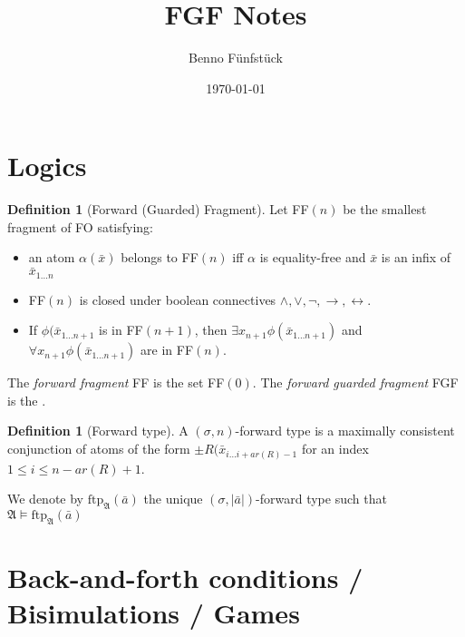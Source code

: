 \documentclass[draft]{scrartcl}
\title{FGF Notes}
\author{Benno Fünfstück}
\date{\today}
\theoremstyle{definition}
\newtheorem{definition}[theorem]{Definition}
\begin{document}
\maketitle

\section{Logics}

\begin{definition}[Forward (Guarded) Fragment]
Let FF$(n)$ be the smallest fragment of FO satisfying:

\begin{itemize}
    \item an atom $\alpha(\bar{x})$ belongs to FF$(n)$ iff $\alpha$ is equality-free and $\bar{x}$ is an infix of $\bar{x}_{1\ldots{}n}$
    \item FF$(n)$ is closed under boolean connectives $\land, \lor, \neg, \rightarrow, \leftrightarrow$.
    \item If $\phi(\bar{x}_{1\ldots{}n+1}$ is in FF$(n+1)$, then $\exists{x_{n+1}}\phi(\bar{x}_{1\ldots{}n+1})$ and $\forall{x_{n+1}}\phi(\bar{x}_{1\ldots{}n+1})$ are in FF$(n)$.
\end{itemize}

The \emph{forward fragment} FF is the set FF$(0)$.
The \emph{forward guarded fragment} FGF is the .
\end{definition}

\begin{definition}[Forward type]
A $(\sigma,n)$-forward type is a maximally consistent conjunction of atoms of the form $\pm{}R(\bar{x}_{i\ldots{}i+ar(R)-1}$ for an index $1 \leq i \leq n - ar(R) + 1$.
\end{definition}

We denote by $\mathrm{ftp}_\mathfrak{A}(\bar{a})$ the unique $(\sigma,|\bar{a}|)$-forward type such that $\mathfrak{A} \models \mathrm{ftp}_\mathfrak{A}(\bar{a})$

\section{Back-and-forth conditions / Bisimulations / Games}
\end{document}
